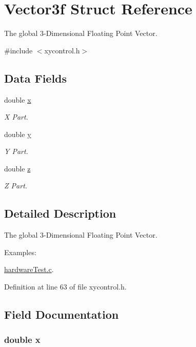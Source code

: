 \hypertarget{struct_vector3f}{\section{Vector3f Struct Reference}
\label{struct_vector3f}
}


The global 3-\/\-Dimensional Floating Point Vector.  




{\ttfamily \#include $<$xycontrol.\-h$>$}

\subsection*{Data Fields}
\begin{DoxyCompactItemize}
\item 
double \hyperlink{struct_vector3f_af88b946fb90d5f08b5fb740c70e98c10}{x}
\begin{DoxyCompactList}\small\item\em X Part. \end{DoxyCompactList}\item 
double \hyperlink{struct_vector3f_ab927965981178aa1fba979a37168db2a}{y}
\begin{DoxyCompactList}\small\item\em Y Part. \end{DoxyCompactList}\item 
double \hyperlink{struct_vector3f_ab3e6ed577a7c669c19de1f9c1b46c872}{z}
\begin{DoxyCompactList}\small\item\em Z Part. \end{DoxyCompactList}\end{DoxyCompactItemize}


\subsection{Detailed Description}
The global 3-\/\-Dimensional Floating Point Vector. 

\begin{Desc}
\item[Examples\-: ]\par
\hyperlink{hardware_test_8c-example}{hardware\-Test.\-c}.\end{Desc}


Definition at line 63 of file xycontrol.\-h.



\subsection{Field Documentation}
\hypertarget{struct_vector3f_af88b946fb90d5f08b5fb740c70e98c10}{
\subsubsection[{x}]{\setlength{\rightskip}{0pt plus 5cm}double x}}\label{struct_vector3f_af88b946fb90d5f08b5fb740c70e98c10}


